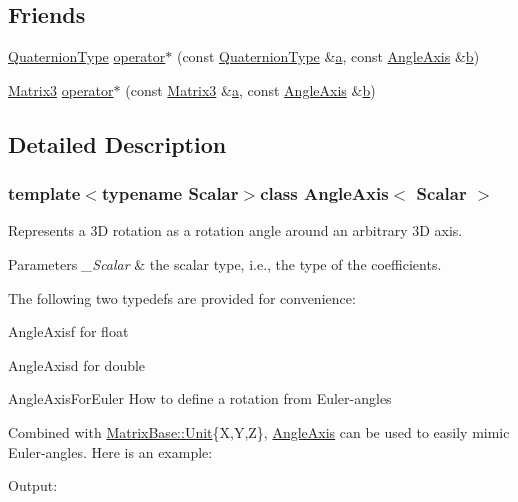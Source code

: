\subsection*{Friends}
\begin{DoxyCompactItemize}
\item 
\hyperlink{class_angle_axis_af3a8449f8ac6c99fa33cac3f390e97f4}{Quaternion\-Type} \hyperlink{class_angle_axis_acdec7200dd68b70b615bcda9659fed26}{operator$\ast$} (const \hyperlink{class_angle_axis_af3a8449f8ac6c99fa33cac3f390e97f4}{Quaternion\-Type} \&\hyperlink{glext_8h_ac8729153468b5dcf13f971b21d84d4e5}{a}, const \hyperlink{class_angle_axis}{Angle\-Axis} \&\hyperlink{glext_8h_a6eba317e3cf44d6d26c04a5a8f197dcb}{b})
\item 
\hyperlink{class_angle_axis_a6f1c9f87a9dccd91fc397e4e007f3668}{Matrix3} \hyperlink{class_angle_axis_a7b353e051be8f249adfa550865415e15}{operator$\ast$} (const \hyperlink{class_angle_axis_a6f1c9f87a9dccd91fc397e4e007f3668}{Matrix3} \&\hyperlink{glext_8h_ac8729153468b5dcf13f971b21d84d4e5}{a}, const \hyperlink{class_angle_axis}{Angle\-Axis} \&\hyperlink{glext_8h_a6eba317e3cf44d6d26c04a5a8f197dcb}{b})
\end{DoxyCompactItemize}


\subsection{Detailed Description}
\subsubsection*{template$<$typename Scalar$>$class Angle\-Axis$<$ Scalar $>$}

Represents a 3\-D rotation as a rotation angle around an arbitrary 3\-D axis. 


\begin{DoxyParams}{Parameters}
{\em \-\_\-\-Scalar} & the scalar type, i.\-e., the type of the coefficients.\\
\hline
\end{DoxyParams}
The following two typedefs are provided for convenience\-: \begin{DoxyItemize}
\item {\ttfamily Angle\-Axisf} for {\ttfamily float} \item {\ttfamily Angle\-Axisd} for {\ttfamily double} \end{DoxyItemize}
Angle\-Axis\-For\-Euler  How to define a rotation from Euler-\/angles

Combined with \hyperlink{class_matrix_base_a22ab640939c63705e936fe08733b0097}{Matrix\-Base\-::\-Unit}\{X,Y,Z\}, \hyperlink{class_angle_axis}{Angle\-Axis} can be used to easily mimic Euler-\/angles. Here is an example\-: 
\begin{DoxyCodeInclude}
\end{DoxyCodeInclude}
 Output\-:
\begin{DoxyVerbInclude}
\end{DoxyVerbInclude}


